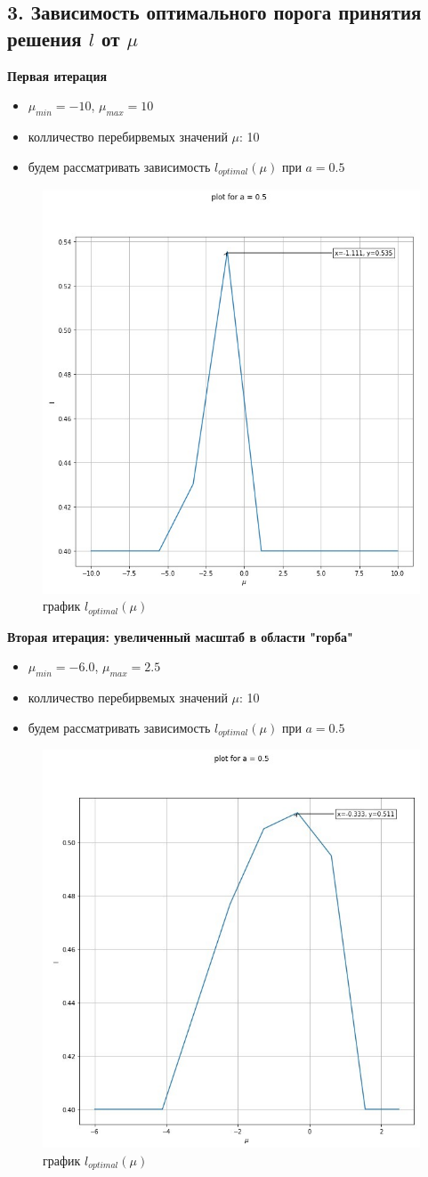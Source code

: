 \documentclass{article}
\begin{document}
\subsection*{3. Зависимость оптимального порога принятия решения $l$ от $\mu$}
	\textbf{Первая итерация}
	\begin{itemize}
	\item $\mu_{min} = -10$, $\mu_{max} = 10$ 
	\item колличество перебирвемых значений $\mu$: 10 
	\item будем рассматривать зависимость $l_{optimal}\left( \mu \right) $ при $a = 0.5$
	\end{itemize}
\begin{figure}[h]
	\centering
	\includegraphics[width=0.35\linewidth]{assets/plot_mu_l.jpg}
	\caption{график $l_{optimal}(\mu)$}
	\label{fig:mpr}
\end{figure}
\textbf{Вторая итерация: увеличенный масштаб в области "горба"}
	\begin{itemize}
	\item $\mu_{min} = -6.0$, $\mu_{max} = 2.5$ 
	\item колличество перебирвемых значений $\mu$: 10 
	\item будем рассматривать зависимость $l_{optimal}\left( \mu \right) $ при $a = 0.5$
\end{itemize}
\begin{figure}[h]
	\centering
	\includegraphics[width=0.35\linewidth]{assets/plot_mu_l_details.jpg}
	\caption{график $l_{optimal}(\mu)$}
	\label{fig:mpr}
\end{figure}
\end{document}
